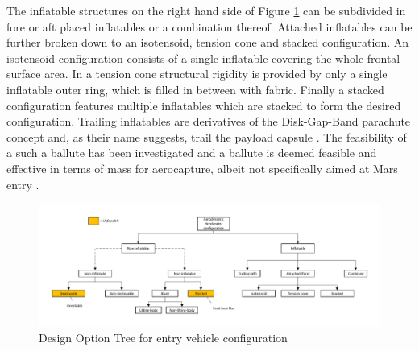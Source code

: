 The inflatable structures on the right hand side of Figure \ref{fig:dotconfig} can be subdivided in fore or aft placed inflatables or a combination thereof. Attached inflatables can be further broken down to an isotensoid, tension cone and stacked configuration. An isotensoid configuration consists of a single inflatable covering the whole frontal surface area. In a tension cone structural rigidity is provided by only a single inflatable outer ring, which is filled in between with fabric. Finally a stacked configuration features multiple inflatables which are stacked to form the desired configuration. \cite{Smith2011, Yamada2009, Hughes2005} Trailing inflatables are derivatives of the Disk-Gap-Band parachute concept and, as their name suggests, trail the payload capsule \cite{Smith2010}. The feasibility of a such a ballute has been investigated and a ballute is deemed feasible and effective in terms of mass for aerocapture, albeit not specifically aimed at Mars entry \cite{Rohrschneider2007, Miller2003}.

\begin{figure}[H]
\hspace{-23mm}
\includegraphics[width = 1.3\textwidth]{Figure/DOT_configuration.pdf}
\vspace{-5mm}
\caption{Design Option Tree for entry vehicle configuration}
\label{fig:dotconfig}
\end{figure}

